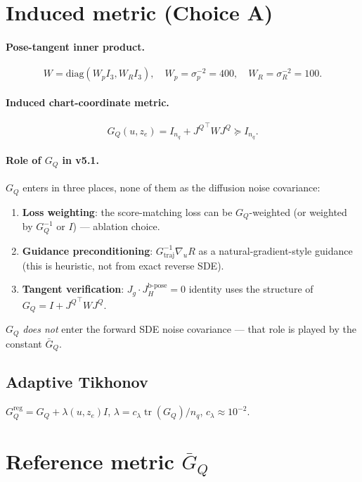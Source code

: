 \documentclass[11pt,a4paper]{article}
\DeclareMathOperator{\tr}{tr}
\newcommand{\JQ}{J^Q}
\newcommand{\GQ}{G_Q}
\newcommand{\GQbar}{\bar G_Q}
\begin{document}
\section{Induced metric (Choice A)}
\label{sec:metric}

\paragraph{Pose-tangent inner product.}
\begin{equation}
W = \mathrm{diag}(W_p I_3, W_R I_3), \quad W_p = \sigma_p^{-2} = 400, \quad W_R = \sigma_R^{-2} = 100.
\end{equation}

\paragraph{Induced chart-coordinate metric.}
\begin{equation}
\GQ(u, z_e) = I_{n_q} + {\JQ}^\top W \JQ \succeq I_{n_q}.
\end{equation}

\paragraph{Role of $\GQ$ in v5.1.} $\GQ$ enters in three places, none of them as the diffusion noise covariance:
\begin{enumerate}[noitemsep]
    \item \textbf{Loss weighting}: the score-matching loss can be $\GQ$-weighted (or weighted by $\GQ^{-1}$ or $I$) — ablation choice.
    \item \textbf{Guidance preconditioning}: $G_\text{traj}^{-1} \nabla_u R$ as a natural-gradient-style guidance (this is heuristic, not from exact reverse SDE).
    \item \textbf{Tangent verification}: $J_g \cdot J_H^{\text{b-pose}} = 0$ identity uses the structure of $\GQ = I + {\JQ}^\top W \JQ$.
\end{enumerate}
$\GQ$ \emph{does not} enter the forward SDE noise covariance — that role is played by the constant $\GQbar$.

\subsection{Adaptive Tikhonov}
\label{sec:tikhonov}
$\GQ^\text{reg} = \GQ + \lambda(u, z_e) I$, $\lambda = c_\lambda \tr(\GQ)/n_q$, $c_\lambda \approx 10^{-2}$.

\section{Reference metric \texorpdfstring{$\GQbar$}{Gbar}}
\label{sec:reference-metric}
\end{document}
